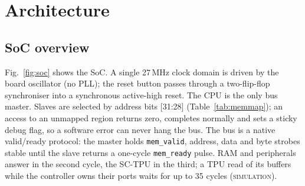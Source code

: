 \documentclass[conference]{IEEEtran}
\newcommand{\lbl}[1]{\textsc{#1}}    %
\begin{document}
\section{Architecture}
\label{sec:arch}

\subsection{SoC overview}
Fig.~\ref{fig:soc} shows the SoC. A single 27\,MHz clock domain is driven by
the board oscillator (no PLL); the reset button passes through a two-flip-flop
synchroniser into a synchronous active-high reset.
The CPU is the only bus master. Slaves are selected by address bits [31:28]
(Table~\ref{tab:memmap}); an access to an unmapped region returns zero,
completes normally and sets a sticky debug flag, so a software error can never
hang the bus. The bus is a native valid/ready protocol: the master holds
\texttt{mem\_valid}, address, data and byte strobes stable until the slave
returns a one-cycle \texttt{mem\_ready} pulse. RAM and peripherals answer in
the second cycle, the SC-TPU in the third; a TPU read of its buffers while the
controller owns their ports waits for up to 35 cycles (\lbl{simulation}).
\end{document}
